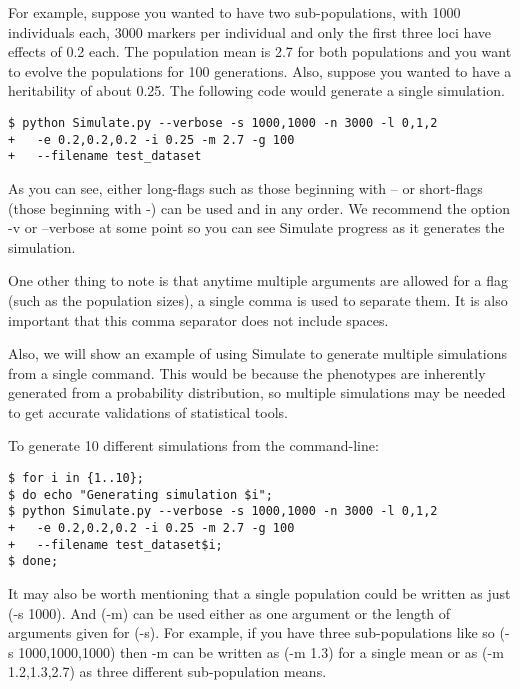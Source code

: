 \documentclass[twoside,a4paper]{refart}
\begin{document}
For example, suppose you wanted to have two sub-populations, with 1000 individuals each, 3000 markers per individual and only the first three loci have effects of 0.2 each. The population mean is 2.7 for both populations and you want to evolve the populations for 100 generations. Also, suppose you wanted to have a heritability of about 0.25. The following code would generate a single simulation.

\begin{lstlisting}[frame=single]
$ python Simulate.py --verbose -s 1000,1000 -n 3000 -l 0,1,2 
+	-e 0.2,0.2,0.2 -i 0.25 -m 2.7 -g 100 
+	--filename test_dataset
\end{lstlisting} 

As you can see, either long-flags such as those beginning with -- or short-flags (those beginning with -) can be used and in any order. We recommend the option -v or --verbose at some point so you can see Simulate progress as it generates the simulation.

One other thing to note is that anytime multiple arguments are allowed for a flag (such as the population sizes), a single comma is used to separate them. It is also important that this comma separator does not include spaces.

Also, we will show an example of using Simulate to generate multiple simulations from a single command. This would be because the phenotypes are inherently generated from a probability distribution, so multiple simulations may be needed to get accurate validations of statistical tools.

To generate 10 different simulations from the command-line:

\begin{lstlisting}[frame=single]
$ for i in {1..10};
$ do echo "Generating simulation $i";
$ python Simulate.py --verbose -s 1000,1000 -n 3000 -l 0,1,2 
+	-e 0.2,0.2,0.2 -i 0.25 -m 2.7 -g 100 
+	--filename test_dataset$i;
$ done;
\end{lstlisting} 

It may also be worth mentioning that a single population could be written as just (-s 1000). And (-m) can be used either as one argument or the length of arguments given for (-s). For example, if you have three sub-populations like so (-s 1000,1000,1000) then -m can be written as (-m 1.3) for a single mean or as (-m 1.2,1.3,2.7) as three different sub-population means. 
\end{document}

